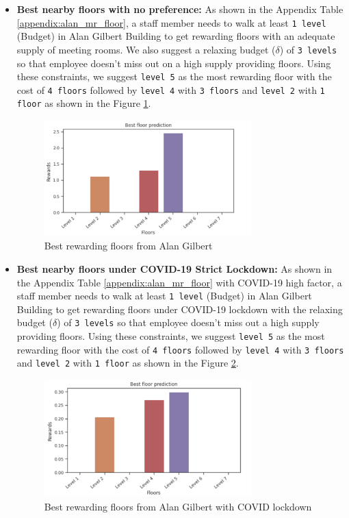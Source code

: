 \begin{itemize}
    \item \textbf{Best nearby floors with no preference:} As shown in the Appendix Table \ref{appendix:alan_mr_floor}, a staff member needs to walk at least \texttt{1 level} (Budget) in Alan Gilbert Building to get rewarding floors with an adequate supply of meeting rooms. We also suggest a relaxing budget ($\delta$) of \texttt{3 levels} so that employee doesn't miss out on a high supply providing floors. Using these constraints, we suggest \texttt{level 5} as the most rewarding floor with the cost of \texttt{4 floors} followed by \texttt{level 4} with \texttt{3 floors} and \texttt{level 2} with \texttt{1 floor} as shown in the Figure \ref{fig:alan-floor-no-factors}.

\begin{figure}[H]
\centering
  \includegraphics[width=8cm]{content/results/floors/plots/alan-floor-no-factors.png}
\caption{Best rewarding floors from Alan Gilbert}
\label{fig:alan-floor-no-factors}
\end{figure}
    
\item \textbf{Best nearby floors under COVID-19 Strict Lockdown:} As shown in the Appendix Table \ref{appendix:alan_mr_floor} with COVID-19 high factor, a staff member needs to walk at least \texttt{1 level} (Budget) in Alan Gilbert Building to get rewarding floors under  COVID-19 lockdown with the relaxing budget ($\delta$) of \texttt{3 levels} so that employee doesn't miss out a high supply providing floors. Using these constraints, we suggest \texttt{level 5} as the most rewarding floor with the cost of \texttt{4 floors} followed by \texttt{level 4} with \texttt{3 floors} and \texttt{level 2} with \texttt{1 floor} as shown in the Figure \ref{fig:alan-floor-covid}.

\begin{figure}[H]
\centering
  \includegraphics[width=8cm]{content/results/floors/plots/alan-floor-covid.png}
\caption{Best rewarding floors from Alan Gilbert with COVID lockdown}
\label{fig:alan-floor-covid}
\end{figure}
    

\end{itemize}
